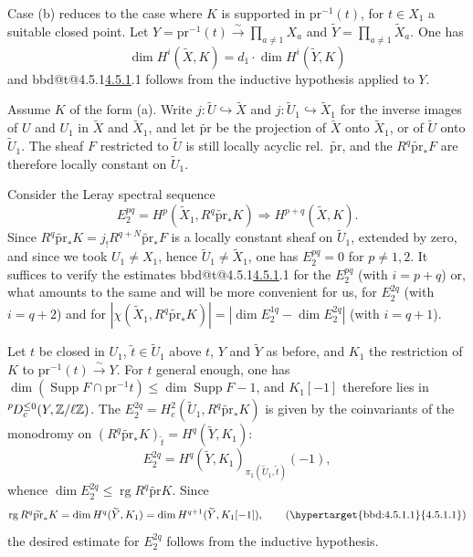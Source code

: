\documentclass[12pt,oneside]{amsbook}
\makeatletter
\newcommand{\bbdreg}[1]{\expandafter\gdef\csname bbd@t@#1\endcsname{1}}
\newcommand{\bbdrecord}[1]{%
  \if@filesw\immediate\write\@auxout{\string\bbdreg{#1}}\fi}
\DeclareRobustCommand{\anch}[1]{\hypertarget{bbd:#1}{#1}\bbdrecord{#1}}
\DeclareRobustCommand{\rn}[1]{%
  \ifcsname bbd@t@#1\endcsname\hyperlink{bbd:#1}{#1}\else#1\fi}
\newcommand{\eqtag}[1]{\stepcounter{equation}\tag{\anch{#1}}}
\theoremstyle{plain}
\theoremstyle{definition}
\newcommand{\Zmod}{\mathbb{Z}/\ell\mathbb{Z}}
\newcommand{\lsup}[1]{{\vphantom{X}}^{#1}\mkern-1.5mu}
\newcommand{\pDc}{\lsup{p}D_{c}}
\DeclareMathOperator{\Supp}{Supp}
\DeclareMathOperator{\rg}{rg}
\newcommand{\into}{\hookrightarrow}
\makeatother
\begin{document}
Case (b) reduces to the case where $K$ is supported in $\mathrm{pr}^{-1}(t)$, for $t\in X_1$ a suitable closed point. Let $Y=\mathrm{pr}^{-1}(t)\xrightarrow{\sim}\prod_{a\neq1}X_a$ and $\widetilde Y=\prod_{a\neq1}\widetilde X_a$. One has
\[
\dim H^i(\widetilde X,K)=d_1\cdot\dim H^i(\widetilde Y,K)
\]
and \rn{4.5.1} follows from the inductive hypothesis applied to $Y$.

Assume $K$ of the form (a). Write $j:\widetilde U\into\widetilde X$ and $j:\widetilde U_1\into\widetilde X_1$ for the inverse images of $U$ and $U_1$ in $\widetilde X$ and $\widetilde X_1$, and let $\widetilde{\mathrm{pr}}$ be the projection of $\widetilde X$ onto $\widetilde X_1$, or of $\widetilde U$ onto $\widetilde U_1$. The sheaf $F$ restricted to $\widetilde U$ is still locally acyclic rel.\ $\widetilde{\mathrm{pr}}$, and the $R^q\widetilde{\mathrm{pr}}_*F$ are therefore locally constant on $\widetilde U_1$.

Consider the Leray spectral sequence
\[
E_2^{pq}=H^p(\widetilde X_1,R^q\widetilde{\mathrm{pr}}_*K)\Longrightarrow
H^{p+q}(\widetilde X,K).
\]
Since $R^q\widetilde{\mathrm{pr}}_*K=j_!R^{q+N}\widetilde{\mathrm{pr}}_*F$ is a locally constant sheaf on $\widetilde U_1$, extended by zero, and since we took $U_1\neq X_1$, hence $\widetilde U_1\neq\widetilde X_1$, one has $E_2^{pq}=0$ for $p\neq1,2$. It suffices to verify the estimates \rn{4.5.1} for the $E_2^{pq}$ (with $i=p+q$) or, what amounts to the same and will be more convenient for us, for $E_2^{2q}$ (with $i=q+2$) and for $|\chi(\widetilde X_1,R^q\widetilde{\mathrm{pr}}_*K)| =|\dim E_2^{1q}-\dim E_2^{2q}|$ (with $i=q+1$).

Let $t$ be closed in $U_1$, $\tilde t\in\widetilde U_1$ above $t$, $Y$ and $\widetilde Y$ as before, and $K_1$ the restriction of $K$ to $\mathrm{pr}^{-1}(t)\xrightarrow{\sim}Y$. For $t$ general enough, one has $\dim(\Supp F\cap \mathrm{pr}^{-1}t)\leq\dim\Supp F-1$, and $K_1[-1]$ therefore lies in $\pDc^{\leq0}(Y,\Zmod)$. The $E_2^{2q}=H_c^2(\widetilde U_1,R^q\widetilde{\mathrm{pr}}_*K)$ is given by the coinvariants of the monodromy on $(R^q\widetilde{\mathrm{pr}}_*K)_{\tilde t}=H^q(\widetilde Y,K_1)$:
\[
E_2^{2q}=H^q(\widetilde Y,K_1)_{\pi_1(\widetilde U_1,\tilde t)}(-1),
\]
whence $\dim E_2^{2q}\leq\rg R^q\widetilde{\mathrm{pr}}K$. Since
\begin{equation}
\rg R^q\widetilde{\mathrm{pr}}_*K=\dim H^q(\widetilde Y,K_1)
=\dim H^{q+1}(\widetilde Y,K_1[-1]),\eqtag{4.5.1.1}
\end{equation}
the desired estimate for $E_2^{2q}$ follows from the inductive hypothesis.
\end{document}
